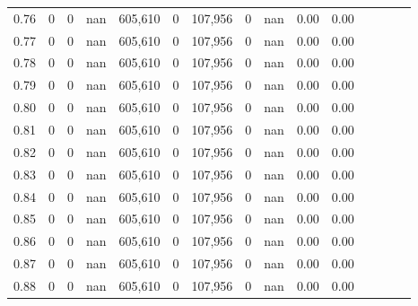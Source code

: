 \begin{tabular}{rrrcrrrrrrrrrrr}
0.76 &       0 &      0 &                                        nan &  605,610 &        0 &  107,956 &        0 &   nan &  0.00 &                         0.00 \\
0.77 &       0 &      0 &                                        nan &  605,610 &        0 &  107,956 &        0 &   nan &  0.00 &                         0.00 \\
0.78 &       0 &      0 &                                        nan &  605,610 &        0 &  107,956 &        0 &   nan &  0.00 &                         0.00 \\
0.79 &       0 &      0 &                                        nan &  605,610 &        0 &  107,956 &        0 &   nan &  0.00 &                         0.00 \\
0.80 &       0 &      0 &                                        nan &  605,610 &        0 &  107,956 &        0 &   nan &  0.00 &                         0.00 \\
0.81 &       0 &      0 &                                        nan &  605,610 &        0 &  107,956 &        0 &   nan &  0.00 &                         0.00 \\
0.82 &       0 &      0 &                                        nan &  605,610 &        0 &  107,956 &        0 &   nan &  0.00 &                         0.00 \\
0.83 &       0 &      0 &                                        nan &  605,610 &        0 &  107,956 &        0 &   nan &  0.00 &                         0.00 \\
0.84 &       0 &      0 &                                        nan &  605,610 &        0 &  107,956 &        0 &   nan &  0.00 &                         0.00 \\
0.85 &       0 &      0 &                                        nan &  605,610 &        0 &  107,956 &        0 &   nan &  0.00 &                         0.00 \\
0.86 &       0 &      0 &                                        nan &  605,610 &        0 &  107,956 &        0 &   nan &  0.00 &                         0.00 \\
0.87 &       0 &      0 &                                        nan &  605,610 &        0 &  107,956 &        0 &   nan &  0.00 &                         0.00 \\
0.88 &       0 &      0 &                                        nan &  605,610 &        0 &  107,956 &        0 &   nan &  0.00 &                         0.00 \\

\end{tabular}
